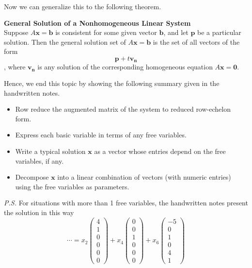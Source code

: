 \documentclass[10pt, a4paper]{article}
\begin{document}
Now we can generalize this to the following theorem.
\begin{proposition}
    \textbf{General Solution of a Nonhomogeneous Linear System}\\
    Suppose $A\mathbf{x}=\mathbf{b}$ is consistent for some given vector $\mathbf{b}$, and let $\mathbf{p}$ be a particular solution.
    Then the general solution set of $A\mathbf{x}=\mathbf{b}$ is the set of all vectors of the form $$\mathbf{p}+t\mathbf{v_n}$$, where $\mathbf{v_n}$ is any solution of the corresponding homogeneous equation $A\mathbf{x}=\mathbf{0}$.
\end{proposition}
\indent Hence, we end this topic by showing the following summary given in the handwritten notes.
\begin{itemize}
    \item Row reduce the augmented matrix of the system to reduced row-echelon form.
    \item Express each basic variable in terms of any free variables.
    \item Write a typical solution $\mathbf{x}$ as a vector whose entries depend on the free variables, if any.
    \item Decompose $\mathbf{x}$ into a linear combination of vectors (with numeric entries) using the free variables as parameters.
\end{itemize}
\indent \textit{P.S.} For situations with more than 1 free variables, the handwritten notes present the solution in this way $$
\cdots = x_2\begin{pmatrix}
    4\\1\\0\\0\\0\\0
\end{pmatrix}+x_4\begin{pmatrix}
    0\\0\\1\\0\\0\\0
\end{pmatrix}+x_6\begin{pmatrix}
    -5\\0\\1\\0\\4\\1
\end{pmatrix}
$$
\end{document}
